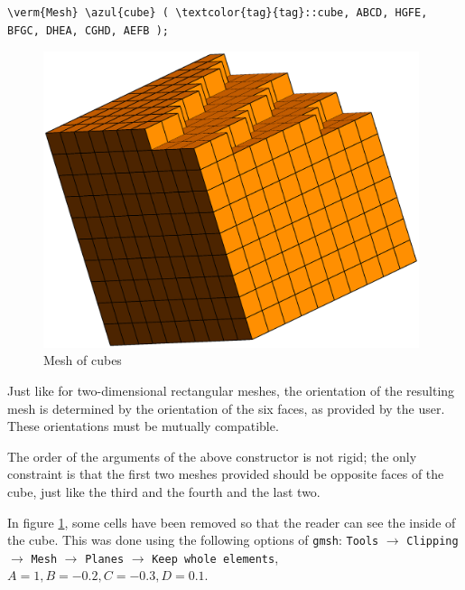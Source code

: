 \begin{Verbatim}[commandchars=\\\{\},formatcom=\small\tt,frame=single,
   label=parag-\ref{\numb section 1.\numb parag 7}.cpp,rulecolor=\color{moldura},
   baselinestretch=0.94,framesep=2mm]
   \verm{Mesh} \azul{cube} ( \textcolor{tag}{tag}::cube, ABCD, HGFE, BFGC, DHEA, CGHD, AEFB );
\end{Verbatim}

\begin{figure}[ht] \centering
  \includegraphics[width=110mm]{cube-cut}
  \caption{Mesh of cubes}
  \label{\numb section 1.\numb fig 9}
\end{figure}


Just like for two-dimensional rectangular meshes, the orientation of the resulting mesh is determined
by the orientation of the six faces, as provided by the user.
These orientations must be mutually compatible.

The order of the arguments of the above {\small\tt{}} constructor is not rigid;
the only constraint is that the first two meshes provided should be opposite faces of the cube,
just like the third and the fourth and the last two.

In figure \ref{\numb section 1.\numb fig 9}, some cells have been removed so that the reader
can see the inside of the cube.
This was done using the following options of {\small\tt gmsh}: {\small\tt Tools} $\to$
{\small\tt Clipping} $\to$ {\small\tt Mesh} $\to$ {\small\tt Planes} $\to$
{\small\tt Keep whole elements}, $ A = 1, B = -0.2, C = -0.3, D = 0.1 $.

